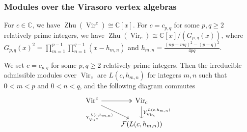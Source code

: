 \documentclass{beamer}
\DeclareMathOperator{\Vir}{Vir}
\DeclareMathOperator{\Zhu}{Zhu}
\begin{document}
\begin{frame}[fragile]
  \frametitle{Modules over the Virasoro vertex algebras}

  \begin{example}
    For $c \in \mathbb{C}$, we have $\Zhu(\Vir^c) \cong \mathbb{C}[x]$.
    For $c = c_{p, q}$ for some $p, q \ge 2$ relatively prime integers, we have $\Zhu(\Vir_c) \cong \mathbb{C}[x]/(G_{p, q}(x))$, where $G_{p ,q}(x)^2 = \prod_{m = 1}^{p - 1}\prod_{n = 1}^{q - 1}(x - h_{m, n})$ and $h_{m, n} = \frac{(np - mq)^2 - (p - q)^2}{4pq}$.
  \end{example}

  \begin{theorem}
    \label{thr:6}
    We set $c = c_{p, q}$ for some $p, q \ge 2$ relatively prime integers.
    Then the irreducible admissible modules over $\Vir_c$ are $L(c, h_{m, n})$ for integers $m, n$ such that $0 < m < p$ and $0 < n < q$, and the following diagram commutes
    \begin{equation*}
      \begin{tikzcd}
        \Vir^c \arrow[r, two heads] \arrow[rd, "{Y^{L(c, h_{m, n})}_{\Vir^c}}"'] & {\Vir_c} \arrow[d, "{Y^{L(c, h_{m, n})}_{\Vir_c}}"] \\
        & {\mathcal{F}(L(c, h_{m, n}))}
      \end{tikzcd}
    \end{equation*}
  \end{theorem}

\end{frame}
\end{document}
